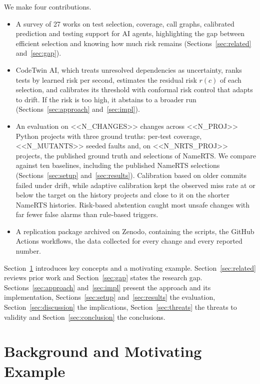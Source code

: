 \documentclass[conference]{IEEEtran}
\begin{document}
We make four contributions.
\begin{itemize}
    \item A survey of 27 works on test selection, coverage, call graphs, calibrated prediction and testing support for AI agents, highlighting the gap between efficient selection and knowing how much risk remains (Sections~\ref{sec:related} and~\ref{sec:gap}).
    \item CodeTwin AI, which treats unresolved dependencies as uncertainty, ranks tests by learned risk per second, estimates the residual risk $r(c)$ of each selection, and calibrates its threshold with conformal risk control that adapts to drift. If the risk is too high, it abstains to a broader run (Sections~\ref{sec:approach} and~\ref{sec:impl}).
    \item An evaluation on <<N_CHANGES>> changes across <<N_PROJ>> Python projects with three ground truths: per-test coverage, <<N_MUTANTS>> seeded faults and, on <<N_NRTS_PROJ>> projects, the published ground truth and selections of NameRTS. We compare against ten baselines, including the published NameRTS selections (Sections~\ref{sec:setup} and~\ref{sec:results}). Calibration based on older commits failed under drift, while adaptive calibration kept the observed miss rate at or below the target on the history projects and close to it on the shorter NameRTS histories. Risk-based abstention caught most unsafe changes with far fewer false alarms than rule-based triggers.
    \item A replication package archived on Zenodo, containing the scripts, the GitHub Actions workflows, the data collected for every change and every reported number.
\end{itemize}

Section~\ref{sec:background} introduces key concepts and a motivating example. Section~\ref{sec:related} reviews prior work and Section~\ref{sec:gap} states the research gap. Sections~\ref{sec:approach} and~\ref{sec:impl} present the approach and its implementation, Sections~\ref{sec:setup} and~\ref{sec:results} the evaluation, Section~\ref{sec:discussion} the implications, Section~\ref{sec:threats} the threats to validity and Section~\ref{sec:conclusion} the conclusions.

\section{Background and Motivating Example}\label{sec:background}
\end{document}
